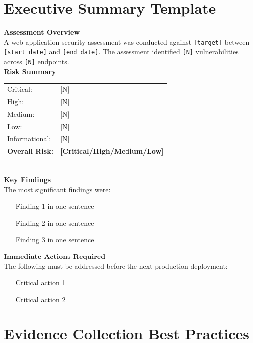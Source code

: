 \section{Executive Summary Template}

\begin{tcolorbox}[findingstyle, title={Executive Summary Template}]
\textbf{Assessment Overview}\\[4pt]
A web application security assessment was conducted against \texttt{[target]} between \texttt{[start date]} and \texttt{[end date]}. The assessment identified \texttt{[N]} vulnerabilities across \texttt{[N]} endpoints.\\[6pt]

\textbf{Risk Summary}\\[4pt]
\begin{tabular}{ll}
Critical: & [N] \\
High: & [N] \\
Medium: & [N] \\
Low: & [N] \\
Informational: & [N] \\
\textbf{Overall Risk:} & \textbf{[Critical/High/Medium/Low]} \\
\end{tabular}\\[6pt]

\textbf{Key Findings}\\[4pt]
The most significant findings were:
\begin{itemize}
  \item [Finding 1 in one sentence]
  \item [Finding 2 in one sentence]
  \item [Finding 3 in one sentence]
\end{itemize}

\textbf{Immediate Actions Required}\\[4pt]
The following must be addressed before the next production deployment:
\begin{itemize}
  \item [Critical action 1]
  \item [Critical action 2]
\end{itemize}
\end{tcolorbox}

\section{Evidence Collection Best Practices}

